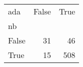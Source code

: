 \begin{tabular}{lrr}
\toprule
ada &  False &  True  \\
nb    &        &        \\
\midrule
False &     31 &     46 \\
True  &     15 &    508 \\
\bottomrule
\end{tabular}
